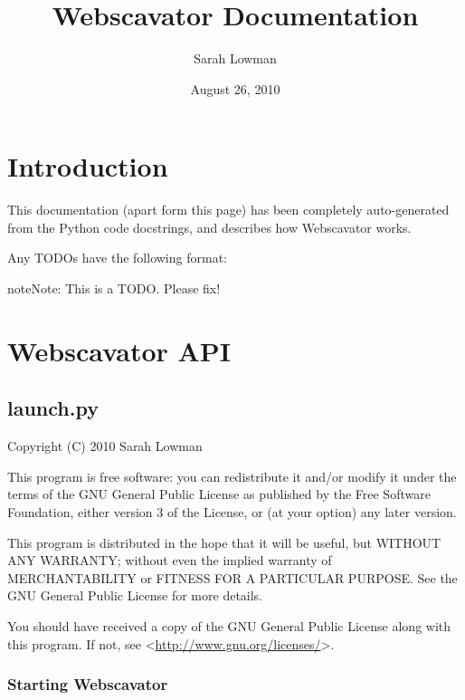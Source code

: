 \documentclass[letterpaper,10pt,english]{manual}
\title{Webscavator Documentation}
\date{August 26, 2010}
\author{Sarah Lowman}
\begin{document}
\maketitle
\tableofcontents




\chapter{Introduction}

This documentation (apart form this page) has been completely auto-generated from the Python code
docstrings, and describes how Webscavator works.

Any TODOs have the following format:

\begin{notice}{note}{Note:}
This is a TODO. Please fix!
\end{notice}


\chapter{Webscavator API}

\resetcurrentobjects
\hypertarget{--doc-launch}{}

\section{launch.py}
\hypertarget{module-launch}{}
\modulesynopsis{}
Copyright (C) 2010 Sarah Lowman

This program is free software: you can redistribute it and/or modify
it under the terms of the GNU General Public License as published by
the Free Software Foundation, either version 3 of the License, or
(at your option) any later version.

This program is distributed in the hope that it will be useful,
but WITHOUT ANY WARRANTY; without even the implied warranty of
MERCHANTABILITY or FITNESS FOR A PARTICULAR PURPOSE.  See the
GNU General Public License for more details.

You should have received a copy of the GNU General Public License
along with this program.  If not, see \textless{}\href{http://www.gnu.org/licenses/}{http://www.gnu.org/licenses/}\textgreater{}.


\subsection{Starting Webscavator}
\end{document}
